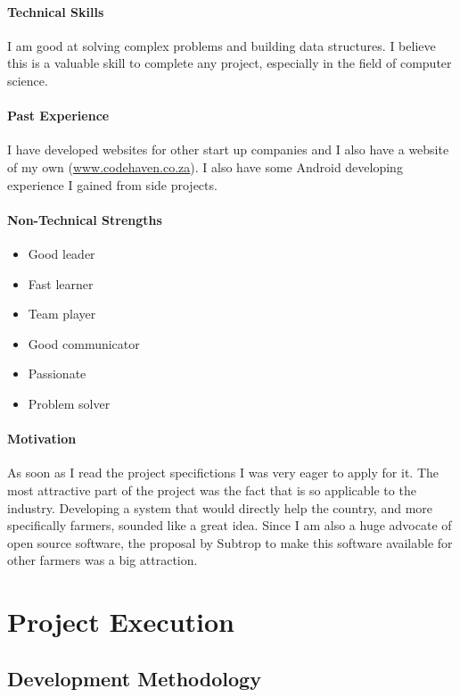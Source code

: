 \documentclass[english]{article}
\begin{document}
			\paragraph{Technical Skills}
			I am good at solving complex problems and building data structures. I believe this is a valuable skill to complete any project, especially in the field of computer science.
			
			\paragraph{Past Experience}
			I have developed websites for other start up companies and I also have a website of my own (\href{http://www.codehaven.co.za}{www.codehaven.co.za}). I also have some Android developing experience I gained from side projects.
			
			\paragraph{Non-Technical Strengths}
			\begin{itemize}
				\setlength\itemsep{0.2em}
				\item Good leader
				\item Fast learner
				\item Team player
				\item Good communicator
				\item Passionate
				\item Problem solver
			\end{itemize}
			
			\paragraph{Motivation}
			As soon as I read the project specifictions I was very eager to apply for it. The most attractive part of the project was the fact that is so applicable to the industry. Developing a system that would directly help the country, and more specifically farmers, sounded like a great idea. Since I am also a huge advocate of open source software, the proposal by Subtrop to make this software available for other farmers was a big attraction.
			
	\newpage
	\section{Project Execution}
		\subsection{Development Methodology}
\end{document}

